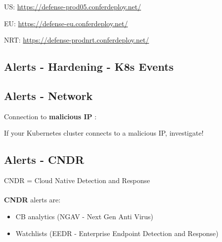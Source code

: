US: \href{https://defense-prod05.conferdeploy.net/}{https://defense-prod05.conferdeploy.net/}

EU: \href{https://defense-eu.conferdeploy.net/}{https://defense-eu.conferdeploy.net/}

NRT: \href{https://defense-prodnrt.conferdeploy.net/}{https://defense-prodnrt.conferdeploy.net/}

\vskip10pt

\begin{obeylines}

\end{obeylines}


\subsection{Alerts - Hardening - K8s Events}


\subsection{Alerts - Network}
\noindent


Connection to \textbf{malicious IP} :



\begin{importantblock}
If your Kubernetes cluster connects to a malicious IP, investigate! 
\end{importantblock} 

\subsection{Alerts - CNDR}

CNDR = Cloud Native Detection and Response

\paragraph{}

\textbf{CNDR} alerts are:
\begin{itemize}
	\item CB analytics (NGAV - Next Gen Anti Virus)
	\item Watchlists (EEDR - Enterprise Endpoint Detection and Response)
\end{itemize}

